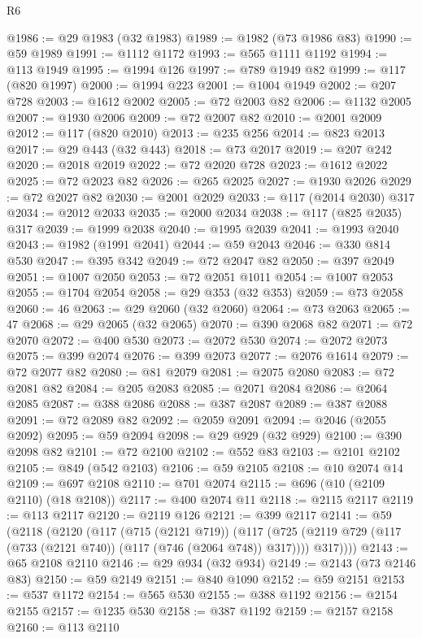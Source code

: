 \begin{lexlean}{R6}
\begin{coremodule}
@1986 := @29 @1983 (@32 @1983)
@1989 := @1982 (@73 @1986 @83)
@1990 := @59 @1989
@1991 := @1112 @1172
@1993 := @565 @1111 @1192
@1994 := @113 @1949
@1995 := @1994 @126
@1997 := @789 @1949 @82
@1999 := @117 (@820 @1997)
@2000 := @1994 @223
@2001 := @1004 @1949
@2002 := @207 @728
@2003 := @1612 @2002
@2005 := @72 @2003 @82
@2006 := @1132 @2005
@2007 := @1930 @2006
@2009 := @72 @2007 @82
@2010 := @2001 @2009
@2012 := @117 (@820 @2010)
@2013 := @235 @256
@2014 := @823 @2013
@2017 := @29 @443 (@32 @443)
@2018 := @73 @2017
@2019 := @207 @242
@2020 := @2018 @2019
@2022 := @72 @2020 @728
@2023 := @1612 @2022
@2025 := @72 @2023 @82
@2026 := @265 @2025
@2027 := @1930 @2026
@2029 := @72 @2027 @82
@2030 := @2001 @2029
@2033 := @117 (@2014 @2030) @317
@2034 := @2012 @2033
@2035 := @2000 @2034
@2038 := @117 (@825 @2035) @317
@2039 := @1999 @2038
@2040 := @1995 @2039
@2041 := @1993 @2040
@2043 := @1982 (@1991 @2041)
@2044 := @59 @2043
@2046 := @330 @814 @530
@2047 := @395 @342
@2049 := @72 @2047 @82
@2050 := @397 @2049
@2051 := @1007 @2050
@2053 := @72 @2051 @1011
@2054 := @1007 @2053
@2055 := @1704 @2054
@2058 := @29 @353 (@32 @353)
@2059 := @73 @2058
@2060 := 46
@2063 := @29 @2060 (@32 @2060)
@2064 := @73 @2063
@2065 := 47
@2068 := @29 @2065 (@32 @2065)
@2070 := @390 @2068 @82
@2071 := @72 @2070
@2072 := @400 @530
@2073 := @2072 @530
@2074 := @2072 @2073
@2075 := @399 @2074
@2076 := @399 @2073
@2077 := @2076 @1614
@2079 := @72 @2077 @82
@2080 := @81 @2079
@2081 := @2075 @2080
@2083 := @72 @2081 @82
@2084 := @205 @2083
@2085 := @2071 @2084
@2086 := @2064 @2085
@2087 := @388 @2086
@2088 := @387 @2087
@2089 := @387 @2088
@2091 := @72 @2089 @82
@2092 := @2059 @2091
@2094 := @2046 (@2055 @2092)
@2095 := @59 @2094
@2098 := @29 @929 (@32 @929)
@2100 := @390 @2098 @82
@2101 := @72 @2100
@2102 := @552 @83
@2103 := @2101 @2102
@2105 := @849 (@542 @2103)
@2106 := @59 @2105
@2108 := @10 @2074 @14
@2109 := @697 @2108
@2110 := @701 @2074
@2115 := @696 (@10 (@2109 @2110) (@18 @2108))
@2117 := @400 @2074 @11
@2118 := @2115 @2117
@2119 := @113 @2117
@2120 := @2119 @126
@2121 := @399 @2117
@2141 := @59
    (@2118
      (@2120
        (@117
          (@715 (@2121 @719))
          (@117
            (@725 (@2119 @729 (@117 (@733 (@2121 @740)) (@117 (@746 (@2064 @748)) @317))))
            @317))))
@2143 := @65 @2108 @2110
@2146 := @29 @934 (@32 @934)
@2149 := @2143 (@73 @2146 @83)
@2150 := @59 @2149
@2151 := @840 @1090
@2152 := @59 @2151
@2153 := @537 @1172
@2154 := @565 @530
@2155 := @388 @1192
@2156 := @2154 @2155
@2157 := @1235 @530
@2158 := @387 @1192
@2159 := @2157 @2158
@2160 := @113 @2110

\end{coremodule}
\end{lexlean}
